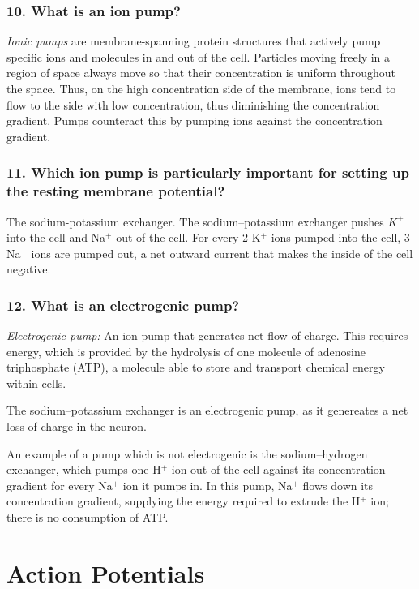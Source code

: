 \subsubsection{10. What is an ion pump?}

\textit{Ionic pumps} are membrane-spanning protein structures that actively pump specific ions and molecules in and out of the cell. Particles moving freely in a region of space always move so that their concentration is uniform throughout the space. Thus, on the high concentration side of the membrane, ions tend to flow to the side with low concentration, thus diminishing the concentration gradient. Pumps counteract this by pumping ions against the concentration gradient.

\subsubsection{11. Which ion pump is particularly important for setting up the resting membrane potential?}

The sodium-potassium exchanger. The sodium–potassium exchanger pushes $K^+$ into the cell and Na$^+$ out of the cell. For every 2 K$^+$ ions pumped into the cell, 3 Na$^+$ ions are pumped out, a net outward current that makes the inside of the cell negative.

\subsubsection{12. What is an electrogenic pump?}


\textit{Electrogenic pump:} An ion pump that generates net flow of charge. This requires energy, which is provided by the hydrolysis of one molecule of adenosine triphosphate (ATP), a molecule able to store and transport chemical energy within cells.

The sodium–potassium exchanger is an electrogenic pump, as it genereates a net loss of charge in the neuron. 

An example of a pump which is not electrogenic is the sodium–hydrogen exchanger, which pumps one H$^+$ ion out of the cell against its concentration gradient for every Na$^+$ ion it pumps in. In this pump, Na$^+$ flows down its concentration gradient, supplying the energy required to extrude the H$^+$ ion; there is no consumption of ATP.





\section{Action Potentials}

